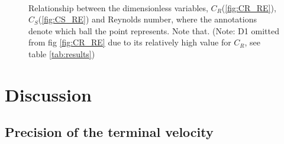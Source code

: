 \documentclass[11pt,a4paper]{article}
\begin{document}
    \begin{figure}[H]
    \center
    \\
    \caption{Relationship between the dimensionless variables, $C_R$(\ref{fig:CR_RE}), $C_S$(\ref{fig:CS_RE}) and Reynolds number, where the annotations denote which ball the point represents. Note that. (Note: D1 omitted from fig \ref{fig:CR_RE} due to its relatively high value for $C_R$, see table \ref{tab:results})}
    \label{fig:plots2}
  \end{figure}




\section{\label{sect:discuss}Discussion}
  \subsection{Precision of the terminal velocity}
\end{document}
